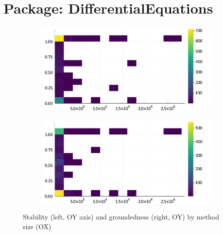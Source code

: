 \section*{Package: DifferentialEquations}
\begin{figure}[h]
     \begin{subfigure}[b]{0.49\textwidth}
       \includegraphics[width=\textwidth]{figs/all-package-graphs/DifferentialEquations-size-vs-stable.pdf}
     \end{subfigure}
     \begin{subfigure}[b]{0.49\textwidth}
       \includegraphics[width=\textwidth]{figs/all-package-graphs/DifferentialEquations-size-vs-grounded.pdf}
     \end{subfigure}
\caption{Stability (left, OY axis) and groundedness (right, OY) by method size (OX)}%
%
\label{figs:size:DifferentialEquations}
\end{figure}

